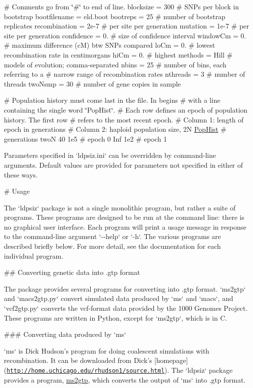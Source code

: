 \# \-Comments go from \char`\"{}\#\char`\"{} to end of line. blocksize = 300 \# \-S\-N\-Ps per block in bootstrap bootfilename = eld.\-boot bootreps = 25 \# number of bootstrap replicates recombination = 2e-\/7 \# per site per generation mutation = 1e-\/7 \# per site per generation confidence = 0. \# size of confidence interval window\-Cm = 0. \# maximum difference (c\-M) btw \-S\-N\-Ps compared lo\-Cm = 0. \# lowest recombination rate in centimorgans hi\-Cm = 0. \# highest methods = \-Hill \# models of evolution; comma-\/separated nbins = 25 \# number of bins, each referring to a \# narrow range of recombination rates nthreads = 3 \# number of threads two\-Nsmp = 30 \# number of gene copies in sample

\# \-Population history must come last in the file. \-In begins \# with a line containing the single word \char`\"{}\-Pop\-Hist\char`\"{}. \# \-Each row defines an epoch of population history. \-The first row \# refers to the most recent epoch. \# \-Column 1\-: length of epoch in generations \# \-Column 2\-: haploid population size, 2\-N \hyperlink{struct_pop_hist}{\-Pop\-Hist} \# generations two\-N 40 1e5 \# epoch 0 \-Inf 1e2 \# epoch 1

\-Parameters specified in `ldpsiz.ini` can be overridden by command-\/line arguments. \-Default values are provided for parameters not specified in either of these ways.

\# \-Usage

\-The `ldpsiz` package is not a single monolithic program, but rather a suite of programs. \-These programs are designed to be run at the command line\-: there is no graphical user interface. \-Each program will print a usage message in response to the command-\/line argument `-\/-\/help` or `-\/h`. \-The various programs are described briefly below. \-For more detail, see the documentation for each individual program.

\#\# \-Converting genetic data into .gtp format

\-The package provides several programs for converting into .gtp format. `ms2gtp` and `macs2gtp.py` convert simulated data produced by `ms` and `macs`, and `vcf2gtp.py` converts the vcf-\/format data provided by the 1000 \-Genomes \-Project. \-These programs are written in \-Python, except for `ms2gtp`, which is in \-C.

\#\#\# \-Converting data produced by `ms`

`ms` is \-Dick \-Hudson's program for doing coalescent simulations with recombination. \-It can be downloaded from \-Dick's \mbox{[}homepage\mbox{]}(\href{http://home.uchicago.edu/rhudson1/source.html}{\tt http\-://home.\-uchicago.\-edu/rhudson1/source.\-html}). \-The `ldpsiz` package provides a program, \hyperlink{ms2gtp_8c_ms2gtp}{ms2gtp}, which converts the output of `ms` into .gtp format.

